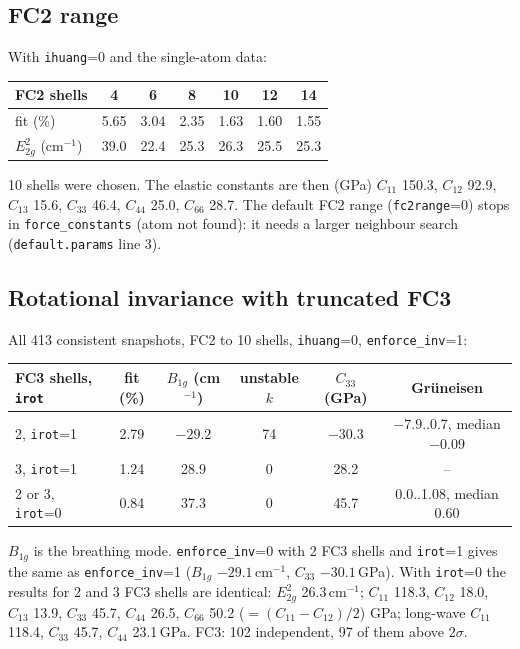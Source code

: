 \documentclass[11pt,a4paper]{article}
\newcommand{\code}[1]{\texttt{#1}}
\begin{document}
\subsection{FC2 range}
With \code{ihuang}=0 and the single-atom data:
\begin{center}
\small
\begin{tabular}{@{}lcccccc@{}}
\toprule
FC2 shells & 4 & 6 & 8 & 10 & 12 & 14\\
\midrule
fit (\%) & 5.65 & 3.04 & 2.35 & 1.63 & 1.60 & 1.55\\
$E_{2g}^2$ (cm$^{-1}$) & 39.0 & 22.4 & 25.3 & 26.3 & 25.5 & 25.3\\
\bottomrule
\end{tabular}
\end{center}
10 shells were chosen. The elastic constants are then (GPa) $C_{11}$ 150.3, $C_{12}$ 92.9, $C_{13}$ 15.6, $C_{33}$
46.4, $C_{44}$ 25.0, $C_{66}$ 28.7. The default FC2 range (\code{fc2range}=0) stops in \code{force\_constants}
(atom not found): it needs a larger neighbour search (\code{default.params} line 3).

\subsection{Rotational invariance with truncated FC3}
All 413 consistent snapshots, FC2 to 10 shells, \code{ihuang}=0, \code{enforce\_inv}=1:
\begin{center}
\small
\begin{tabular}{@{}lccccc@{}}
\toprule
FC3 shells, \code{irot} & fit (\%) & $B_{1g}$ (cm$^{-1}$) & unstable $k$ & $C_{33}$ (GPa) & Gr\"uneisen\\
\midrule
2, \code{irot}=1 & 2.79 & $-29.2$ & 74 & $-30.3$ & $-7.9$..0.7, median $-0.09$\\
3, \code{irot}=1 & 1.24 & 28.9 & 0 & 28.2 & --\\
2 or 3, \code{irot}=0 & 0.84 & 37.3 & 0 & 45.7 & 0.0..1.08, median 0.60\\
\bottomrule
\end{tabular}
\end{center}
$B_{1g}$ is the breathing mode. \code{enforce\_inv}=0 with 2 FC3 shells and \code{irot}=1 gives the same as
\code{enforce\_inv}=1 ($B_{1g}$ $-29.1$\,cm$^{-1}$, $C_{33}$ $-30.1$\,GPa). With \code{irot}=0 the results for 2 and 3 FC3
shells are identical: $E_{2g}^2$ 26.3\,cm$^{-1}$; $C_{11}$ 118.3, $C_{12}$ 18.0, $C_{13}$ 13.9, $C_{33}$ 45.7, $C_{44}$ 26.5,
$C_{66}$ 50.2 ($=(C_{11}-C_{12})/2$) GPa; long-wave $C_{11}$ 118.4, $C_{33}$ 45.7, $C_{44}$ 23.1\,GPa. FC3: 102
independent, 97 of them above $2\sigma$.
\end{document}
